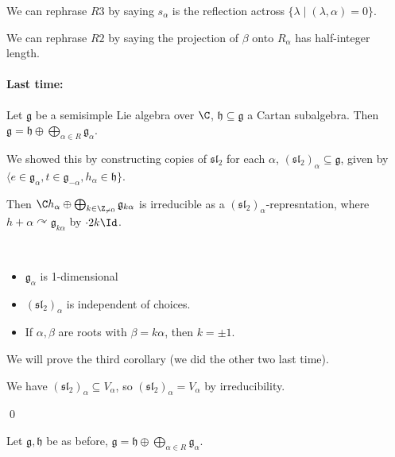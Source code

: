 \documentclass[x11names,reqno,14pt]{extarticle}
\newcommand{\mk}[1]{\mathfrak{#1}}
\newcommand{\g}{\mk{g}}
\newcommand{\h}{\mk{h}}
\renewcommand{\sl}{\mk{s}\mk{l}}
\begin{document}
We can rephrase $R3$ by saying $s_\alpha$ is the reflection actross $\{\lambda \mid (\lambda,\alpha) =0\}$. 

We can rephrase $R2$ by saying the projection of $\beta$ onto $R_\alpha$ has half-integer length. 

\paragraph{Last time:} 

Let $\g$ be a semisimple Lie algebra over $\C$, $\h\subseteq\g$ a Cartan subalgebra. Then $\g = \h \oplus \bigoplus_{\alpha\in R}\g_\alpha$. 

We showed this by constructing copies of $\sl_2$ for each $\alpha$, $(\sl_2)_\alpha \subseteq \g$, given by $\langle e \in \g_\alpha, t \in \g_{-\alpha}, h_\alpha \in \h\}$. 

Then $\C h_\alpha\oplus\bigoplus_{k\in\Z_{\neq0}}\g_{k\alpha}$ is irreducible as a $(\sl_2)_\alpha$-represntation, where $h+\alpha \curvearrowright \g_{k\alpha}$ by $\cdot 2k\Id$. 


\cor
\,
\begin{itemize}

\item $\g_\alpha$ is 1-dimensional 

\item $(\sl_2)_\alpha$ is independent of choices. 

\item If $\alpha,\beta$ are roots with $\beta = k\alpha$, then $k = \pm 1$. 

\end{itemize}

\proof

We will prove the third corollary (we did the other two last time). 

We have $(\sl_2)_\alpha\subseteq V_\alpha$, so $(\sl_2)_\alpha = V_\alpha$ by irreducibility. 

\qed

\thm

Let $\g,\h$ be as before, $\g = \h \oplus \bigoplus_{\alpha\in R}\g_\alpha$. 
\end{document}
